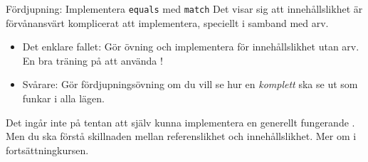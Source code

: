 

\begin{Slide}{Fördjupning: Implementera \texttt{equals} med \texttt{match}}
Det visar sig att innehållslikhet är förvånansvärt komplicerat att implementera, speciellt  i samband med arv.
\begin{itemize}
\item Det enklare fallet: Gör övning  och implementera  för innehållslikhet utan arv. \\ En bra träning på att använda !

\item Svårare: Gör fördjupningsövning  om du vill se hur en \emph{komplett}  ska se ut som funkar i alla lägen.

\end{itemize}

Det ingår inte på tentan att själv kunna implementera en generellt fungerande . Men du ska förstå skillnaden mellan referenslikhet och innehållslikhet. Mer om  i fortsättningkursen.
\end{Slide}
